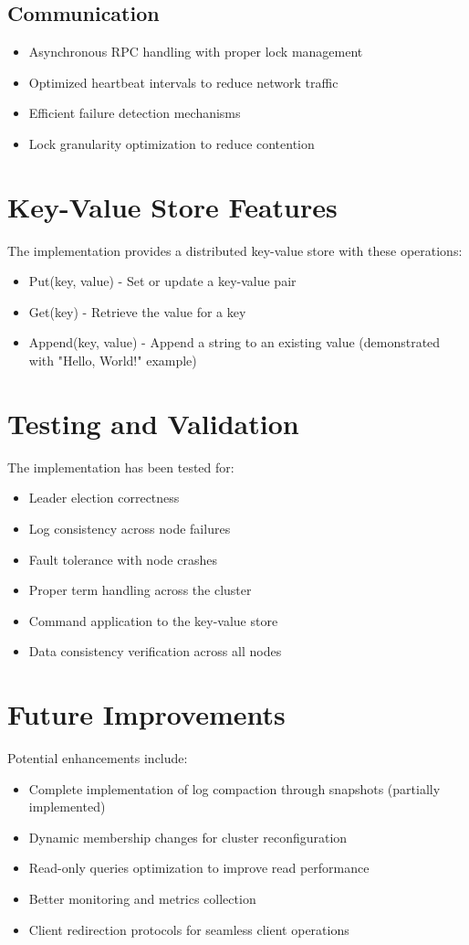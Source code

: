 \documentclass{article}
\begin{document}
\subsection{Communication}
\begin{itemize}
    \item Asynchronous RPC handling with proper lock management
    \item Optimized heartbeat intervals to reduce network traffic
    \item Efficient failure detection mechanisms
    \item Lock granularity optimization to reduce contention
\end{itemize}

\section{Key-Value Store Features}
The implementation provides a distributed key-value store with these operations:
\begin{itemize}
    \item Put(key, value) - Set or update a key-value pair
    \item Get(key) - Retrieve the value for a key
    \item Append(key, value) - Append a string to an existing value (demonstrated with "Hello, World!" example)
\end{itemize}

\section{Testing and Validation}
The implementation has been tested for:
\begin{itemize}
    \item Leader election correctness
    \item Log consistency across node failures
    \item Fault tolerance with node crashes
    \item Proper term handling across the cluster
    \item Command application to the key-value store
    \item Data consistency verification across all nodes
\end{itemize}

\section{Future Improvements}
Potential enhancements include:
\begin{itemize}
    \item Complete implementation of log compaction through snapshots (partially implemented)
    \item Dynamic membership changes for cluster reconfiguration
    \item Read-only queries optimization to improve read performance
    \item Better monitoring and metrics collection
    \item Client redirection protocols for seamless client operations
\end{itemize}
\end{document}
